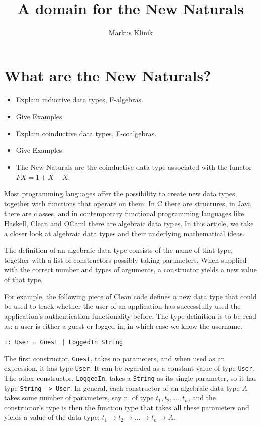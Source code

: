 \documentclass[a4paper]{article}
\newcommand{\arr}{\rightarrow}
\begin{document}
\title{A domain for the New Naturals}
\author{Markus Klinik}
\maketitle


\section{What are the New Naturals?}


\begin{itemize}
\item Explain inductive data types, F-algebras.
\item Give Examples.
\item Explain coinductive data types, F-coalgebras.
\item Give Examples.
\item The New Naturals are the coinductive data type associated with the
functor $FX = 1 + X + X$.
\end{itemize}


Most programming languages offer the possibility to create new data types,
together with functions that operate on them.  In C there are structures, in
Java there are classes, and in contemporary functional programming languages
like Haskell, Clean and OCaml there are algebraic data types.  In this article,
we take a closer look at algebraic data types and their underlying mathematical
ideas.

The definition of an algebraic data type consists of the name of that type,
together with a list of constructors possibly taking parameters.  When supplied
with the correct number and types of arguments, a constructor yields a new
value of that type.

For example, the following piece of Clean code defines a new data type that
could be used to track whether the user of an application has successfully used
the application's authentication functionality before.  The type definition is
to be read as: a user is either a guest or logged in, in which case we know the
username.

\begin{verbatim}
:: User = Guest | LoggedIn String
\end{verbatim}

The first constructor, \verb+Guest+, takes no parameters, and when used as an
expression, it has type \verb+User+.  It can be regarded as a constant value of
type \verb+User+.  The other constructor, \verb+LoggedIn+, takes a
\verb+String+ as its single parameter, so it has type \verb+String -> User+.
In general, each constructor of an algebraic data type $A$ takes some number of
parameters, say n, of type $t_1, t_2, \ldots, t_n$, and the constructor's type
is then the function type that takes all these parameters and yields a value of
the data type: $t_1 \arr t_2 \arr \ldots \arr t_n \arr A$.
\end{document}
